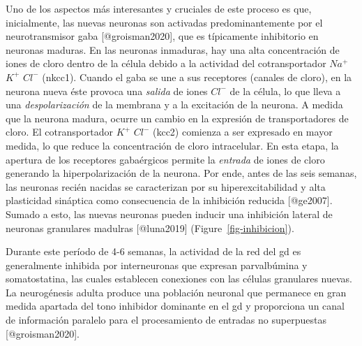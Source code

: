 \documentclass[
  11pt]{../MastersDoctoralThesisUNAM}
\begin{document}
\begin{tcolorbox}[enhanced jigsaw, colframe=quarto-callout-warning-color-frame, left=2mm, bottomrule=.15mm, rightrule=.15mm, arc=.35mm, toprule=.15mm, leftrule=.75mm, breakable, opacityback=0, colback=white]
Uno de los aspectos más interesantes y cruciales de este proceso es que,
inicialmente, las nuevas neuronas son activadas predominantemente por el
neurotransmisor \ac{gaba} {[}@groisman2020{]}, que es típicamente
inhibitorio en neuronas maduras. En las neuronas inmaduras, hay una alta
concentración de iones de cloro dentro de la célula debido a la
actividad del cotransportador \(Na^+\) \(K^+\) \(Cl^-\) (nkcc1). Cuando
el \ac{gaba} se une a sus receptores (canales de cloro), en la neurona
nueva éste provoca una \emph{salida} de iones \(Cl^-\) de la célula, lo
que lleva a una \emph{despolarización} de la membrana y a la excitación
de la neurona. A medida que la neurona madura, ocurre un cambio en la
expresión de transportadores de cloro. El cotransportador \(K^+\)
\(Cl^-\) (kcc2) comienza a ser expresado en mayor medida, lo que reduce
la concentración de cloro intracelular. En esta etapa, la apertura de
los receptores \ac{gaba}érgicos permite la \emph{entrada} de iones de
cloro generando la hiperpolarización de la neurona. Por ende, antes de
las seis semanas, las neuronas recién nacidas se caracterizan por su
hiperexcitabilidad y alta plasticidad sináptica como consecuencia de la
inhibición reducida {[}@ge2007{]}. Sumado a esto, las nuevas neuronas
pueden inducir una inhibición lateral de neuronas granulares madulras
{[}@luna2019{]} (Figure~\ref{fig-inhibicion}).

Durante este período de 4-6 semanas, la actividad de la red del \ac{gd}
es generalmente inhibida por interneuronas que expresan parvalbúmina y
somatostatina, las cuales establecen conexiones con las células
granulares nuevas. La neurogénesis adulta produce una población neuronal
que permanece en gran medida apartada del tono inhibidor dominante en el
\ac{gd} y proporciona un canal de información paralelo para el
procesamiento de entradas no superpuestas {[}@groisman2020{]}.

\begin{figure}[H]

\centering{

}
\end{figure}
\end{tcolorbox}
\end{document}
